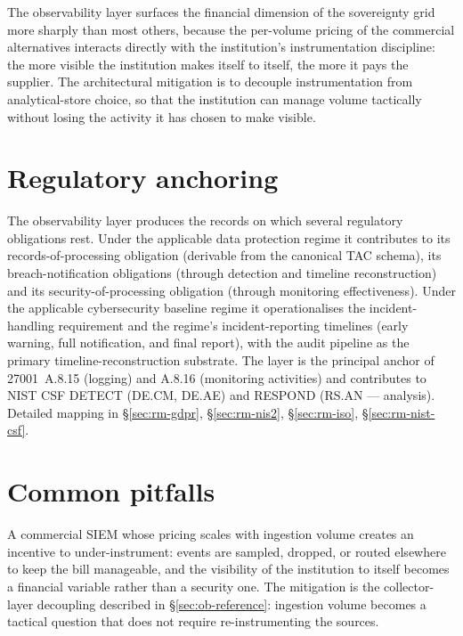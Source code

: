 \noindent The observability layer surfaces the financial dimension
of the sovereignty grid more sharply than most others, because the
per-volume pricing of the commercial alternatives interacts directly
with the institution's instrumentation discipline: the more visible
the institution makes itself to itself, the more it pays the
supplier. The architectural mitigation is to decouple instrumentation
from analytical-store choice, so that the institution can manage
volume tactically without losing the activity it has chosen to
make visible.

\section{Regulatory anchoring}
\label{sec:ob-regulatory}

\noindent The observability layer produces the records on which
several regulatory obligations rest. Under the applicable data
protection regime it
contributes to its records-of-processing obligation (derivable from
the canonical TAC schema), its breach-notification obligations
(through detection and timeline reconstruction) and its
security-of-processing obligation (through monitoring effectiveness).
Under the applicable cybersecurity baseline regime it
operationalises the incident-handling requirement
and the regime's incident-reporting timelines (early warning,
full notification, and final report), with the audit
pipeline as the primary timeline-reconstruction substrate. The
layer is the principal anchor of 27001~A.8.15 (logging) and
A.8.16 (monitoring activities) and contributes to NIST CSF
\textsf{DETECT} (DE.CM, DE.AE) and \textsf{RESPOND} (RS.AN ---
analysis). Detailed mapping in 
\S\ref{sec:rm-gdpr}, \S\ref{sec:rm-nis2}, \S\ref{sec:rm-iso},
\S\ref{sec:rm-nist-csf}.

\section{Common pitfalls}
\label{sec:ob-pitfalls}

\begin{pitfallbox}
\noindent A commercial SIEM whose pricing scales with ingestion
volume creates an incentive to under-instrument: events are
sampled, dropped, or routed elsewhere to keep the bill manageable,
and the visibility of the institution to itself becomes a financial
variable rather than a security one. The mitigation is the
collector-layer decoupling described in
\S\ref{sec:ob-reference}: ingestion volume becomes a tactical
question that does not require re-instrumenting the sources.
\end{pitfallbox}

